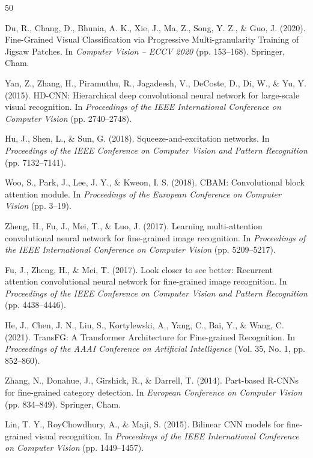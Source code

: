 \documentclass[pdflatex,iicol,sn-mathphys-num]{sn-jnl}
\theoremstyle{thmstyleone}%
\theoremstyle{thmstyletwo}%
\theoremstyle{thmstylethree}%
\begin{document}
{\footnotesize
\begin{thebibliography}{50}

    Du, R., Chang, D., Bhunia, A. K., Xie, J., Ma, Z., Song, Y. Z., \& Guo, J. (2020).
    Fine-Grained Visual Classification via Progressive Multi-granularity Training of Jigsaw Patches.
    In \textit{Computer Vision -- ECCV 2020} (pp. 153--168). Springer, Cham.

     Yan, Z., Zhang, H., Piramuthu, R., Jagadeesh, V., DeCoste, D., Di, W., \& Yu, Y. (2015). HD-CNN: Hierarchical deep convolutional neural network for large-scale visual recognition. In \textit{Proceedings of the IEEE International Conference on Computer Vision} (pp. 2740--2748).
    
     Hu, J., Shen, L., \& Sun, G. (2018). Squeeze-and-excitation networks. In \textit{Proceedings of the IEEE Conference on Computer Vision and Pattern Recognition} (pp. 7132--7141).
    
     Woo, S., Park, J., Lee, J. Y., \& Kweon, I. S. (2018). CBAM: Convolutional block attention module. In \textit{Proceedings of the European Conference on Computer Vision} (pp. 3--19).
    
     Zheng, H., Fu, J., Mei, T., \& Luo, J. (2017). Learning multi-attention convolutional neural network for fine-grained image recognition. In \textit{Proceedings of the IEEE International Conference on Computer Vision} (pp. 5209--5217).
    
     Fu, J., Zheng, H., \& Mei, T. (2017). Look closer to see better: Recurrent attention convolutional neural network for fine-grained image recognition. In \textit{Proceedings of the IEEE Conference on Computer Vision and Pattern Recognition} (pp. 4438--4446).
    
     He, J., Chen, J. N., Liu, S., Kortylewski, A., Yang, C., Bai, Y., \& Wang, C. (2021). TransFG: A Transformer Architecture for Fine-grained Recognition. In \textit{Proceedings of the AAAI Conference on Artificial Intelligence} (Vol. 35, No. 1, pp. 852--860).
    
     Zhang, N., Donahue, J., Girshick, R., \& Darrell, T. (2014). Part-based R-CNNs for fine-grained category detection. In \textit{European Conference on Computer Vision} (pp. 834--849). Springer, Cham.
    
     Lin, T. Y., RoyChowdhury, A., \& Maji, S. (2015). Bilinear CNN models for fine-grained visual recognition. In \textit{Proceedings of the IEEE International Conference on Computer Vision} (pp. 1449--1457).
    

\end{thebibliography}}
\end{document}
